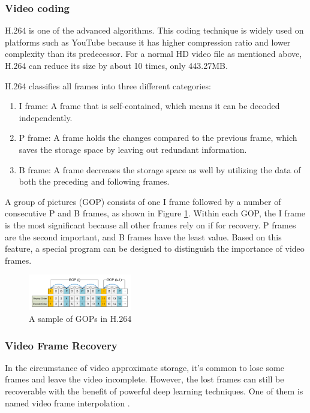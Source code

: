 \documentclass[sigconf]{acmart}
\begin{document}
\subsubsection{Video coding}
H.264 \cite{wiegand2003overview} is one of the advanced algorithms. This coding technique is widely used on platforms such as YouTube because it has higher compression ratio and lower complexity than its predecessor. For a normal HD video file as mentioned above, H.264 can reduce its size by about 10 times, only 443.27MB.

H.264 classifies all frames into three different categories:
\begin{enumerate}
    \item I frame: A frame that is self-contained, which means it can be decoded independently.
    \item P frame: A frame holds the changes compared to the previous frame, which saves the storage space by leaving out redundant information.
    \item B frame: A frame decreases the storage space as well by utilizing the data of both the preceding and following frames.
\end{enumerate}
A group of pictures (GOP) consists of one I frame followed by a number of consecutive P and B frames, as shown in Figure \ref{H264-IPB}.
Within each GOP, the I frame is the most significant because all other frames rely on if for recovery. P frames are the second important, and B frames have the least value.
Based on this feature, a special program can be designed to distinguish the importance of video frames.

\begin{figure}[ht]
\centering
\includegraphics[width=0.4\textwidth]{photo/H264_IPB.pdf}
\vspace{-3mm}
\caption{A sample of GOPs in H.264}
\vspace{-3mm}
\label{H264-IPB}
\end{figure}

\subsubsection{Video Frame Recovery}
In the circumstance of video approximate storage, it's common to lose some frames and leave the video incomplete. However, the lost frames can still be recoverable with the benefit of powerful deep learning techniques. One of them is named video frame interpolation \cite{meyer2015phase, niklaus2018context, van2017frame}.
\end{document}
